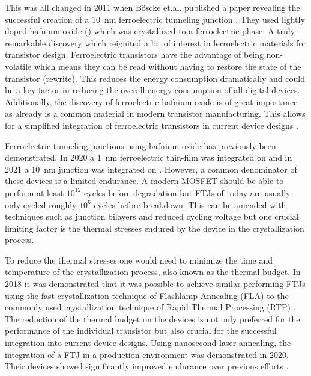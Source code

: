 \documentclass[11pt,twoside]{eitExjobb}
\begin{document}
This was all changed in 2011 when Böscke et.al. published a paper revealing the
successful creation of a \SI{10}{\nano\meter} ferroelectric tunneling junction
\cite{boscke2011ferroelectricity}. They used lightly doped hafnium oxide
() which was crystallized to a ferroelectric phase. A truly remarkable
discovery which reignited a lot of interest in ferroelectric materials for
transistor design. Ferroelectric transistors have the advantage of being
non-volatile which means they can be read without having to restore the state
of the transistor (rewrite). This reduces the energy consumption dramatically
and could be a key factor in reducing the overall energy consumption of all
digital devices. Additionally, the discovery of ferroelectric hafnium oxide is
of great importance as  already is a common material in modern transistor
manufacturing. This allows for a simplified integration of ferroelectric
transistors in current device designs \cite{mikolajick2020past}.

Ferroelectric tunneling junctions using hafnium oxide has previously been
demonstrated. In 2020 a \SI{1}{\nano\meter} ferroelectric thin-film was
integrated on  and in 2021 a \SI{10}{\nano\meter} junction was
integrated on  \cite{cheema2020one, athle2021effects}. However, a
common denominator of these devices is a limited endurance. A modern MOSFET
should be able to perform at least $10^{12}$ cycles before degradation but FTJs
of today are usually only cycled roughly $10^6$ cycles before breakdown. This
can be amended with techniques such as junction bilayers and reduced cycling
voltage but one crucial limiting factor is the thermal stresses endured by the
device in the crystallization process.

To reduce the thermal stresses one would need to minimize the time and
temperature of the crystallization process, also known as the thermal budget.
In 2018 it was demonstrated that it was possible to achieve similar performing
FTJs using the fast crystallization technique of Flashlamp Annealing (FLA) to
the commonly used crystallization technique of Rapid Thermal Processing (RTP) 
\cite{oconnor2018stabilization}. The reduction of the thermal budget on the
devices is not only preferred for the performance of the individual transistor
but also crucial for the successful integration into current device designs.
Using nanosecond laser annealing, the integration of a FTJ in a production
environment was demonstrated in 2020. Their devices showed significantly
improved endurance over previous efforts \cite{grenouillet2020nanosecond}.
\end{document}
